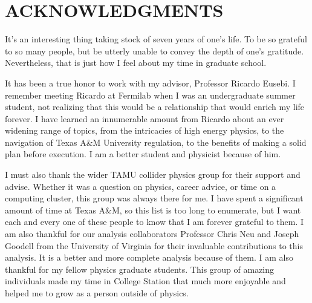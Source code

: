 %
%
%


\chapter*{ACKNOWLEDGMENTS}


\indent It's an interesting thing taking stock of seven years of one's life. To be so grateful to so many people, but be utterly unable to convey the depth of one's gratitude. Nevertheless, that is just how I feel about my time in graduate school.

It has been a true honor to work with my advisor, Professor Ricardo Eusebi. I remember meeting Ricardo at Fermilab when I was an undergraduate summer student, not realizing that this would be a relationship that would enrich my life forever. I have learned an innumerable amount from Ricardo about an ever widening range of topics, from the intricacies of high energy physics, to the navigation of Texas A\&M University regulation, to the benefits of making a solid plan before execution. I am a better student and physicist because of him.

I must also thank the wider TAMU collider physics group for their support and advise. Whether it was a question on physics, career advice, or time on a computing cluster, this group was always there for me. I have spent a significant amount of time at Texas A\&M, so this list is too long to enumerate, but I want each and every one of these people to know that I am forever grateful to them. I am also thankful for our analysis collaborators Professor Chris Neu and Joseph Goodell from the University of Virginia for their invaluable contributions to this analysis. It is a better and more complete analysis because of them. I am also thankful for my fellow physics graduate students. This group of amazing individuals made my time in College Station that much more enjoyable and helped me to grow as a person outside of physics.

